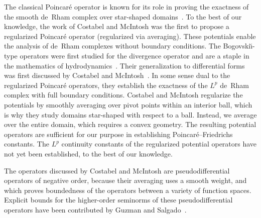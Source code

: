\documentclass[10pt,letterpaper]{article}
\newcommand{\todo}[1]{\textcolor{red}{TODO: #1}}
\begin{document}


\begin{remark}
    The classical Poincar\'e operator is known for its role in proving the exactness of the smooth de~Rham complex over star-shaped domains~\cite{lee2012smooth}.
    To the best of our knowledge, the work of Costabel and McIntosh was the first to propose a regularized Poincar\'e operator (regularized via averaging).
    These potentials enable the analysis of de~Rham complexes without boundary conditions.
    The Bogovski\u{\i}-type operators were first studied for the divergence operator and are a staple in the mathematics of hydrodynamics~\cite{bogovskii1979solution}.
    Their generalization to differential forms was first discussed by Costabel and McIntosh~\cite{costabel2010bogovskiui}. 
    In some sense dual to the regularized Poincar\'e operators, they establish the exactness of the $L^{p}$ de~Rham complex with full boundary conditions.
    Costabel and McIntosh regularize the potentials by smoothly averaging over pivot points within an interior ball, 
    which is why they study domains star-shaped with respect to a ball. 
    Instead, we average over the entire domain, which requires a convex geometry. 
    The resulting potential operators are sufficient for our purpose in establishing Poincar\'e--Friedrichs constants. 
    The $L^{p}$ continuity constants of the regularized potential operators have not yet been established, to the best of our knowledge.
    
    The operators discussed by Costabel and McIntosh are pseudodifferential operators of negative order, 
    because their averaging uses a smooth weight, and which proves boundedness of the operators between a variety of function spaces. 
    Explicit bounds for the higher-order seminorms of these pseudodifferential operators 
    have been contributed by Guzman and Salgado~\cite{guzman2021estimation}. %
\end{remark}
\end{document}
